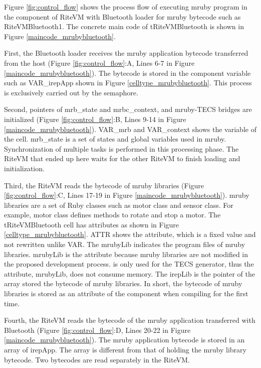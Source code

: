\documentclass{sig-alternate-05-2015}
\begin{document}
Figure \ref{fig:control_flow} shows the process flow of executing mruby program in the component of RiteVM with Bluetooth loader for mruby bytecode such as RiteVMBluetooth1.
The concrete main code of tRiteVMBluetooth is shown in Figure \ref{maincode_mrubybluetooth}.

First, the Bluetooth loader receives the mruby application bytecode transferred from the host (Figure \ref{fig:control_flow}:A, Lines 6-7 in Figure \ref{maincode_mrubybluetooth}).
The bytecode is stored in the component variable such as VAR\_irepApp shown in Figure \ref{celltype_mrubybluetooth}.
This process is exclusively carried out by the semaphore.

Second, pointers of {\myit mrb\_state} and {\myit mrbc\_context}, and mruby-TECS bridges are initialized (Figure \ref{fig:control_flow}:B, Lines 9-14 in Figure \ref{maincode_mrubybluetooth}).
{\myit VAR\_mrb} and {\myit VAR\_context} shows the variable of the {\myit cell}.
{\myit mrb\_state} is a set of states and global variables used in mruby.
Synchronization of multiple tasks is performed in this processing phase.
The RiteVM that ended up here waits for the other RiteVM to finish loading and initialization.

Third, the RiteVM reads the bytecode of mruby libraries (Figure \ref{fig:control_flow}:C, Lines 17-19 in Figure \ref{maincode_mrubybluetooth}).
mruby libraries are a set of Ruby classes such as motor class and sensor class.
For example, motor class defines methods to rotate and stop a motor.
The tRiteVMBluetooth {\myit cell} has attributes as shown in Figure \ref{celltype_mrubybluetooth}.
{\myit ATTR} shows the attribute, which is a fixed value and not rewritten unlike {\myit VAR}.
The {\myit mrubyLib} indicates the program files of mruby libraries.
{\myit mrubyLib} is the attribute because mruby libraries are not modified in the proposed development process.
{\myit [omit]} is only used for the TECS generator, thus the attribute, {\myit mrubyLib}, does not consume memory.
The {\myit irepLib} is the pointer of the array stored the bytecode of mruby libraries.
In short, the bytecode of mruby libraries is stored as an attribute of the component when compiling for the first time.

Fourth, the RiteVM reads the bytecode of the mruby application transferred with Bluetooth (Figure \ref{fig:control_flow}:D, Lines 20-22 in Figure \ref{maincode_mrubybluetooth}).
The mruby application bytecode is stored in an array of {\myit irepApp}.
The array is different from that of holding the mruby library bytecode.
Two bytecodes are read separately in the RiteVM.
\end{document}
